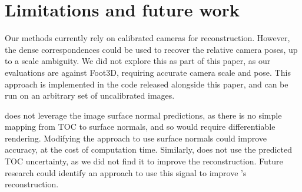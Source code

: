 \section{Limitations and future work}

Our methods currently rely on calibrated cameras for reconstruction. However, the dense correspondences could be used to recover the relative camera poses, up to a scale ambiguity. We did not explore this as part of this paper, as our evaluations are against Foot3D, requiring accurate camera scale and pose. This approach is implemented in the code released alongside this paper, and can be run on an arbitrary set of uncalibrated images.

\ourOptim does not leverage the image surface normal predictions, as there is no simple mapping from TOC to surface normals, and so would require differentiable rendering. Modifying the approach to use surface normals could improve accuracy, at the cost of computation time. Similarly, \ourSfM does not use the predicted TOC uncertainty, as we did not find it to improve the reconstruction. Future research could identify an approach to use this signal to improve \ourSfM's reconstruction.\\